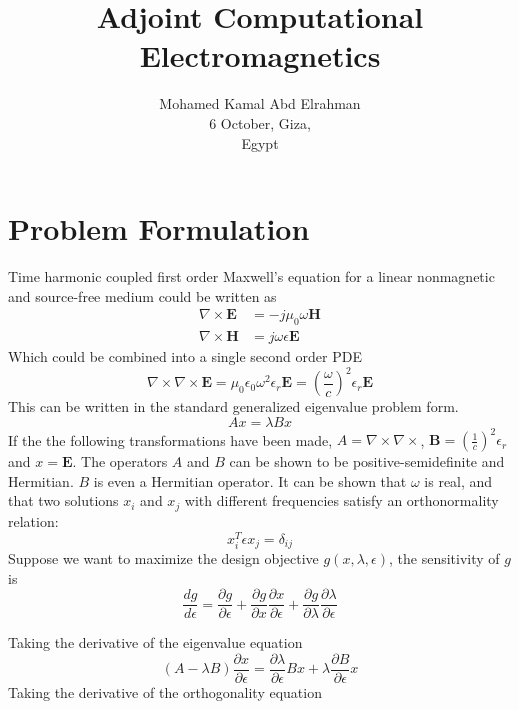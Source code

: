 \documentclass{tufte-handout}
\title{ Adjoint Computational Electromagnetics}
\author[mohamedkamal]{Mohamed Kamal Abd Elrahman \\
6 October, Giza,\\ Egypt}
\begin{document}
	\maketitle

 \section{Problem Formulation}
Time harmonic coupled first order Maxwell's equation for a linear nonmagnetic and source-free medium could be written as 
\begin{subequations}
	\begin{align}
	\nabla \times \mathbf{E}  &= -j \mu_0  \omega \mathbf{H}\\
	\nabla \times \mathbf{H}  &=   j \omega \epsilon \mathbf{E}
	\end{align}
\end{subequations}
Which could be combined into a single second order PDE 
\begin{equation}
\nabla \times \nabla \times \mathbf{E}  = \mu_0  \epsilon_0 \omega^2    \epsilon_r \mathbf{E} = \left( \frac{\omega}{c} \right)^2     \epsilon_r \mathbf{E}
\end{equation}
This can be written in the standard generalized eigenvalue problem form.
\begin{equation}
A x = \lambda B x
\end{equation}
If the the following transformations have been made, $A = \nabla \times \nabla \times  $, $\mathbf{B} = \left( \frac{1}{c} \right)^2     \epsilon_r $ and  $x = \mathbf{E}$. The operators $A$ and $B$ can be shown to be positive-semidefinite and Hermitian. $B$ is even a Hermitian operator. It can be shown that $\omega$ is real, and that two solutions $x_i$ and $x_j$ with different frequencies satisfy an orthonormality relation:
\begin{equation}
x_i^T \epsilon x_j = \delta_{ij}
\end{equation}
Suppose we want to maximize the design objective $g(x,\lambda,\epsilon)$, the sensitivity of $g$ is 
\begin{equation}
\frac{d g}{d \epsilon} = \frac{\partial g}{\partial \epsilon} +  \frac{\partial g}{\partial x}  \frac{\partial x}{\partial \epsilon} +  \frac{\partial g}{\partial \lambda} \frac{\partial \lambda}{\partial \epsilon}
\end{equation} 

Taking the derivative of the eigenvalue equation
\begin{equation}
(A -\lambda B) \frac{\partial  x}{\partial \epsilon}   =  \frac{\partial \lambda}{\partial \epsilon} B x +  \lambda  \frac{\partial  B}{\partial \epsilon} x 
\end{equation}
Taking the derivative of the orthogonality equation
\end{document}
